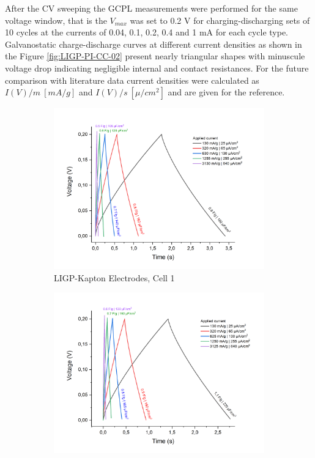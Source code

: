 After the CV sweeping the GCPL measurements were performed for the same voltage window, that is the $V_{max}$ was set to 0.2 V for charging-discharging sets of 10 cycles at the currents of 0.04, 0.1, 0.2, 0.4 and 1 mA for each cycle type. Galvanostatic charge-discharge curves at different current densities as shown in the Figure \ref{fig:LIGP-PI-CC-02} present nearly triangular shapes with minuscule voltage drop indicating negligible internal and contact resistances. For the future comparison with literature data current densities were calculated as $I(V)/m\:[mA/g]$ and $I(V)/s\:[\mu /cm^2]$ and are given for the reference.

\begin{figure}[H]
\begin{subfigure}{0.49\textwidth}
\includegraphics[width=1\textwidth]{Figures/Results/Electrochemistry/LIGP-PI-NaNO3-Swagelok/Cell1/GCPL_Vmax02_cell1_diff-current-Cs.jpg} 
\captionsetup{width=0.9\linewidth}
\caption{LIGP-Kapton Electrodes, Cell 1}
\label{fig:LIG-PI-cell1-CC-02}
\end{subfigure}
\begin{subfigure}{0.49\textwidth}
\includegraphics[width=1\textwidth]{Figures/Results/Electrochemistry/LIGP-PI-NaNO3-Swagelok/Cell2/GCPL_Vmax02_cell2_diff-current-Cs.jpg}

\end{subfigure}
\end{figure}
